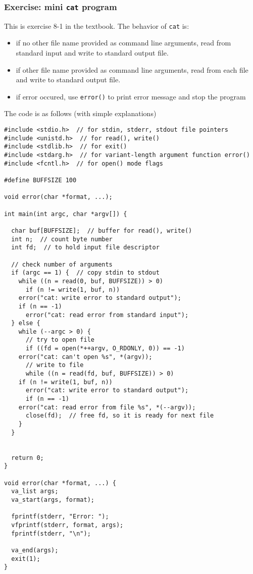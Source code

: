 \documentclass[11pt]{article}
\begin{document}
\subsubsection{Exercise: mini \texttt{cat} program}
\label{sec:org8baa8ef}
This is exercise 8-1 in the textbook. The behavior of \texttt{cat} is:
\begin{itemize}
\item if no other file name provided as command line arguments, read from standard input and write to standard output file.
\item if other file name provided as command line arguments, read from each file and write to standard output file.
\item if error occured, use \texttt{error()} to print error message and stop the program
\end{itemize}

The code is as follows (with simple explanations)
\begin{verbatim}
#include <stdio.h>  // for stdin, stderr, stdout file pointers
#include <unistd.h>  // for read(), write()
#include <stdlib.h>  // for exit()
#include <stdarg.h>  // for variant-length argument function error()
#include <fcntl.h>  // for open() mode flags

#define BUFFSIZE 100

void error(char *format, ...);

int main(int argc, char *argv[]) {

  char buf[BUFFSIZE];  // buffer for read(), write()
  int n;  // count byte number
  int fd;  // to hold input file descriptor

  // check number of arguments
  if (argc == 1) {  // copy stdin to stdout
    while ((n = read(0, buf, BUFFSIZE)) > 0)
      if (n != write(1, buf, n))
	error("cat: write error to standard output");
    if (n == -1)
      error("cat: read error from standard input");
  } else {
    while (--argc > 0) {
      // try to open file
      if ((fd = open(*++argv, O_RDONLY, 0)) == -1)
	error("cat: can't open %s", *(argv));
      // write to file 
      while ((n = read(fd, buf, BUFFSIZE)) > 0)
	if (n != write(1, buf, n))
	  error("cat: write error to standard output");
      if (n == -1)
	error("cat: read error from file %s", *(--argv));
      close(fd);  // free fd, so it is ready for next file 
    }
  }


  return 0;
}

void error(char *format, ...) {
  va_list args;
  va_start(args, format);

  fprintf(stderr, "Error: ");
  vfprintf(stderr, format, args);
  fprintf(stderr, "\n");

  va_end(args);
  exit(1);
}
\end{verbatim}
\end{document}
